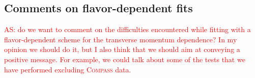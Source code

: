 \documentclass[aps,preprintnumbers,showpacs,nofootinbib,superscriptaddress,floatfix]{revtex4}
\newcommand{\compass}{\textsc{Compass }}
\newcommand{\bb}{\zeta}
\begin{document}
\subsection{Comments on flavor-dependent fits}
\label{ss:comment_fldep}

\textcolor{red}{AS: do we want to comment on the difficulties encountered while fitting with a flavor-dependent scheme for the transverse momentum dependence? In my opinion we should do it, but I also think that we should aim at conveying a positive message. For example, we could talk about some of the tests that we have performed excluding \compass data.}

%
%
%
%
\end{document}
